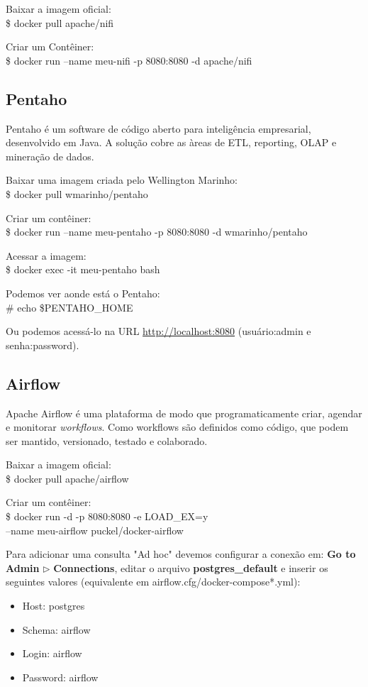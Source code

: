 \documentclass[a4paper,11pt]{article}
\begin{document}
Baixar a imagem oficial: \\
{\ttfamily\$ docker pull apache/nifi}

Criar um Contêiner: \\
{\ttfamily\$ docker run --name meu-nifi -p 8080:8080 -d apache/nifi}

\subsection{Pentaho}
Pentaho é um software de código aberto para inteligência empresarial, desenvolvido em Java. A solução cobre as àreas de ETL, reporting, OLAP e mineração de dados. 

Baixar uma imagem criada pelo Wellington Marinho: \\
{\ttfamily\$ docker pull wmarinho/pentaho}

Criar um contêiner: \\
{\ttfamily\$ docker run --name meu-pentaho -p 8080:8080 -d wmarinho/pentaho} 

Acessar a imagem: \\
{\ttfamily\$ docker exec -it meu-pentaho bash}

Podemos ver aonde está o Pentaho: \\
{\ttfamily\# echo \$PENTAHO\_HOME}

Ou podemos acessá-lo na URL \url{http://localhost:8080} (usuário:admin e senha:password).

\subsection{Airflow}
Apache Airflow é uma plataforma de modo que programaticamente criar, agendar e monitorar \textit{workflows}. Como workflows são definidos como código, que podem ser mantido, versionado, testado e colaborado. 

Baixar a imagem oficial: \\
{\ttfamily\$ docker pull apache/airflow}

Criar um contêiner: \\
{\ttfamily\$ docker run -d -p 8080:8080 -e LOAD\_EX=y \\
--name meu-airflow puckel/docker-airflow}

Para adicionar uma consulta "Ad hoc" devemos configurar a conexão em: \textbf{Go to Admin} $\triangleright$ \textbf{Connections}, editar o arquivo \textbf{postgres\_default} e inserir os seguintes valores (equivalente em airflow.cfg/docker-compose*.yml): \vspace{-1em}
\begin{itemize}[noitemsep]
	\item Host: postgres
	\item Schema: airflow
	\item Login: airflow
	\item Password: airflow
\end{itemize}
\end{document}
